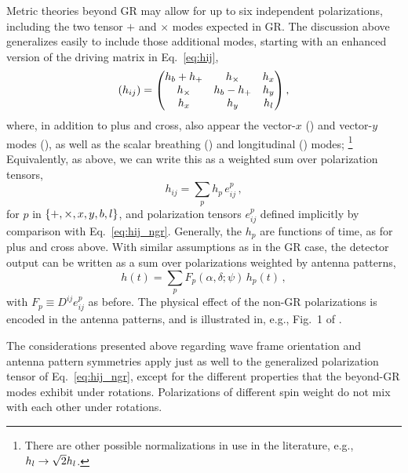 \documentclass[aps,prd,twocolumn,superscriptaddress,preprintnumbers,floatfix,nofootinbib]{revtex4-2}
\newcommand{\beq}{\begin{equation}}
\newcommand{\eeq}{\end{equation}}
\newcommand*{\eq}[1]{Eq.~\eqref{eq:#1}}
\begin{document}
Metric theories beyond GR may allow for up to six independent polarizations, including the two tensor $+$ and $\times$ modes expected in GR.
The discussion above generalizes easily to include those additional modes, starting with an enhanced version of the driving matrix in Eq.~\eqref{eq:hij},
\beq \label{eq:hij_ngr}
(h_{ij}) = \begin{pmatrix}
\hb + h_+ & h_\times  & \hx  \\
h_\times  & \hb - h_+ & \hy  \\
\hx    & \hy    & \hlon
\end{pmatrix} ,
\eeq
where, in addition to plus and cross, also appear the vector-$x$ (\xsym) and vector-$y$ modes (\ysym), as well as the scalar breathing (\bsym) and longitudinal (\lsym) modes;%
\footnote{There are other possible normalizations in use in the literature, e.g., $h_{{l}} \to \sqrt{2} h_{{l}}$.}
Equivalently, as above, we can write this as a weighted sum over polarization tensors,
\beq
h_{ij} = \sum_p h_p\, e^p_{ij} \, ,
\eeq
for $p$ in $\{+,\times, x, {y}, {b}, {l}\}$, and polarization tensors $e^p_{ij}$ defined implicitly by comparison with Eq.~\eqref{eq:hij_ngr}.
Generally, the $h_p$ are functions of time, as for plus and cross above.
%
With similar assumptions as in the GR case, the detector output can be written as a sum over polarizations weighted by antenna patterns,
\beq \label{eq:h_ngr}
h(t) = \sum_p F_p(\alpha, \delta; \psi)\, h_p(t)\, ,
\eeq
with $F_p \equiv D^{ij} e^p_{ij}$ as before. 
The physical effect of the non-GR polarizations is encoded in the antenna patterns, and is illustrated in, e.g., Fig.~1 of \cite{Isi:2017equ}.

The considerations presented above regarding wave frame orientation and antenna pattern symmetries apply just as well to the generalized polarization tensor of Eq.~\eqref{eq:hij_ngr}, except for the different properties that the beyond-GR modes exhibit under rotations.
Polarizations of different spin weight do not mix with each other under rotations.
\end{document}
